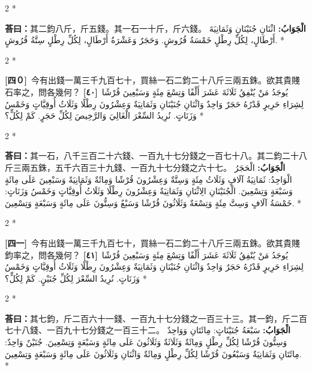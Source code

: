 \documentclass[11pt,a4paper]{article}
\newcommand{\ar}[1]{\arabicfont\beginR #1\endR}
\newcommand{\problemnum}[1]{\textbf{[\ignorespaces#1\unskip]}}
\newenvironment{bilingual}{%
  \begin{paracol}{2}%
  \switchcolumn[0]*%
}{%
  \end{paracol}%
}
\newcommand{\cnline}[1]{\switchcolumn[0]\noindent #1 \switchcolumn[1]}
\newcommand{\arline}[1]{\noindent\ar{#1} \switchcolumn[0]*}
\newenvironment{prob bilingual}{%
  \begin{paracol}{2}%
  \switchcolumn[0]*%
}{%
  \end{paracol}%
  \vspace{0.3em}%
}
\begin{document}
\begin{bilingual}
\cnline{\textcolor{answercolor}{\textbf{荅曰：}}其二鈞八斤，斤五錢。其一石一十斤，斤六錢。}
\arline{\textcolor{answercolor}{\textbf{الْجَوَابُ:}} اثْنَانِ جُنَيْنَانِ وَثَمَانِيَةَ أَرْطَالٍ، لِكُلِّ رِطْلٍ خَمْسَةُ قُرُوشٍ. وَحَجَرٌ وَعَشْرَةُ أَرْطَالٍ، لِكُلِّ رِطْلٍ سِتَّةُ قُرُوشٍ.}
\end{bilingual}

\begin{bilingual}
\cnline{\problemnum{四０}\, 今有出錢一萬三千九百七十，買絲一石二鈞二十八斤三兩五銖。欲其貴賤石率之，問各幾何？}
\arline{\problemnum{٤٠}\, يُوجَدُ مَنْ يُنْفِقُ ثَلَاثَةَ عَشَرَ أَلْفًا وَتِسْعَ مِئَةٍ وَسَبْعِينَ قُرْشًا لِشِرَاءِ حَرِيرٍ قَدْرُهُ حَجَرٌ وَاحِدٌ وَاثْنَانِ جُنَيْنَانِ وَثَمَانِيَةٌ وَعِشْرُونَ رِطْلًا وَثَلَاثُ أُوقِيَّاتٍ وَخَمْسُ وَزَنَاتٍ. نُرِيدُ السِّعْرَ الْغَالِيَ وَالرَّخِيصَ لِكُلِّ حَجَرٍ. كَمْ لِكُلٍّ؟}
\end{bilingual}

\begin{bilingual}
\cnline{\textcolor{answercolor}{\textbf{荅曰：}}其一石，八千三百二十六錢、一百九十七分錢之一百七十八。其二鈞二十八斤三兩五銖，五千六百三十九錢、一百九十七分錢之六十七。}
\arline{\textcolor{answercolor}{\textbf{الْجَوَابُ:}} الْحَجَرُ الْوَاحِدُ: ثَمَانِيَةُ آلَافٍ وَثَلَاثُ مِئَةٍ وَسِتَّةٌ وَعِشْرُونَ قُرْشًا وَمِائَةٌ وَثَمَانِيَةً وَسَبْعِينَ عَلَى مِائَةٍ وَسَبْعَةٍ وَتِسْعِينَ. الْجُنَيْنَانِ الِاثْنَانِ وَثَمَانِيَةٌ وَعِشْرُونَ رِطْلًا وَثَلَاثُ أُوقِيَّاتٍ وَخَمْسُ وَزَنَاتٍ: خَمْسَةُ آلَافٍ وَسِتَّ مِئَةٍ وَتِسْعَةٌ وَثَلَاثُونَ قُرْشًا وَسَبْعٌ وَسِتُّونَ عَلَى مِائَةٍ وَسَبْعَةٍ وَتِسْعِينَ.}
\end{bilingual}

\begin{bilingual}
\cnline{\problemnum{四一}\, 今有出錢一萬三千九百七十，買絲一石二鈞二十八斤三兩五銖。欲其貴賤鈞率之，問各幾何？}
\arline{\problemnum{٤١}\, يُوجَدُ مَنْ يُنْفِقُ ثَلَاثَةَ عَشَرَ أَلْفًا وَتِسْعَ مِئَةٍ وَسَبْعِينَ قُرْشًا لِشِرَاءِ حَرِيرٍ قَدْرُهُ حَجَرٌ وَاحِدٌ وَاثْنَانِ جُنَيْنَانِ وَثَمَانِيَةٌ وَعِشْرُونَ رِطْلًا وَثَلَاثُ أُوقِيَّاتٍ وَخَمْسُ وَزَنَاتٍ. نُرِيدُ السِّعْرَ لِكُلِّ جُنَيْنٍ. كَمْ لِكُلٍّ؟}
\end{bilingual}

\begin{bilingual}
\cnline{\textcolor{answercolor}{\textbf{荅曰：}}其七鈞，斤二百六十一錢、一百九十七分錢之一百三十三。其一鈞，斤二百七十八錢、一百九十七分錢之一百三十二。}
\arline{\textcolor{answercolor}{\textbf{الْجَوَابُ:}} سَبْعَةُ جُنَيْنَاتٍ: مِائَتَانِ وَوَاحِدٌ وَسِتُّونَ قُرْشًا لِكُلِّ رِطْلٍ وَمِائَةٌ وَثَلَاثَةٌ وَثَلَاثُونَ عَلَى مِائَةٍ وَسَبْعَةٍ وَتِسْعِينَ. جُنَيْنٌ وَاحِدٌ: مِائَتَانِ وَثَمَانِيَةٌ وَسَبْعُونَ قُرْشًا لِكُلِّ رِطْلٍ وَمِائَةٌ وَاثْنَانِ وَثَلَاثُونَ عَلَى مِائَةٍ وَسَبْعَةٍ وَتِسْعِينَ.}
\end{bilingual}
\end{document}
